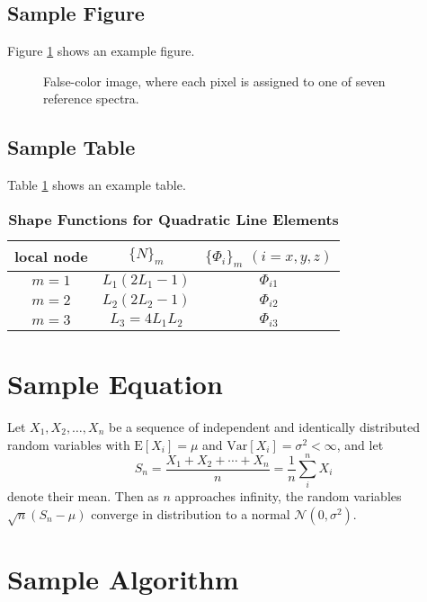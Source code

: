 \documentclass[9pt]{osa-supplemental-document}
\begin{document}
\subsection{Sample Figure}

Figure \ref{fig:false-color} shows an example figure.

\begin{figure}[htbp]
\centering
{}
\caption{False-color image, where each pixel is assigned to one of seven reference spectra.}
\label{fig:false-color}
\end{figure}

\subsection{Sample Table}

Table \ref{tab:shape-functions} shows an example table. 

\begin{table}[htbp]
\centering
\caption{\bf Shape Functions for Quadratic Line Elements}
\begin{tabular}{ccc}
\hline
local node & $\{N\}_m$ & $\{\Phi_i\}_m$ $(i=x,y,z)$ \\
\hline
$m = 1$ & $L_1(2L_1-1)$ & $\Phi_{i1}$ \\
$m = 2$ & $L_2(2L_2-1)$ & $\Phi_{i2}$ \\
$m = 3$ & $L_3=4L_1L_2$ & $\Phi_{i3}$ \\
\hline
\end{tabular}
  \label{tab:shape-functions}
\end{table}

\section{Sample Equation}

Let $X_1, X_2, \ldots, X_n$ be a sequence of independent and identically distributed random variables with $\text{E}[X_i] = \mu$ and $\text{Var}[X_i] = \sigma^2 < \infty$, and let
\begin{equation}
S_n = \frac{X_1 + X_2 + \cdots + X_n}{n}
      = \frac{1}{n}\sum_{i}^{n} X_i
\label{eq:refname1}
\end{equation}
denote their mean. Then as $n$ approaches infinity, the random variables $\sqrt{n}(S_n - \mu)$ converge in distribution to a normal $\mathcal{N}(0, \sigma^2)$.

\section{Sample Algorithm}
\end{document}
